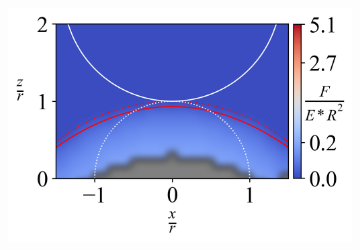 \begin{figure}[ht]
\begin{subfigure}[t]{0.345\textwidth}
        \centering
        \caption{\label{fig: Hemisphere-ContourPlot-7} }
        \includegraphics[width=1\linewidth]{Figures/Hemisphere-ContourPlot-7.png}
    \end{subfigure}


    \hfill
    \vspace{-0.3in}
     

\end{figure}
